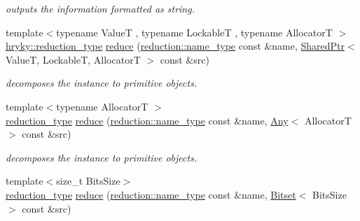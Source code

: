 \begin{DoxyCompactItemize}
\begin{DoxyCompactList}\small\item\em outputs the information formatted as string. \end{DoxyCompactList}\item 
\hypertarget{namespacehryky_abe460d6765cad7fbca8945ceb1d9d52e}{{\footnotesize template$<$typename Value\-T , typename Lockable\-T , typename Allocator\-T $>$ }\\\hyperlink{namespacehryky_a343a9a4c36a586be5c2693156200eadc}{hryky\-::reduction\-\_\-type} \hyperlink{namespacehryky_abe460d6765cad7fbca8945ceb1d9d52e}{reduce} (\hyperlink{namespacehryky_1_1reduction_ac686c30a4c8d196bbd0f05629a6b921f}{reduction\-::name\-\_\-type} const \&name, \hyperlink{classhryky_1_1_shared_ptr}{Shared\-Ptr}$<$ Value\-T, Lockable\-T, Allocator\-T $>$ const \&src)}\label{namespacehryky_abe460d6765cad7fbca8945ceb1d9d52e}

\begin{DoxyCompactList}\small\item\em decomposes the instance to primitive objects. \end{DoxyCompactList}\item 
\hypertarget{namespacehryky_a694d24276778b9967b22a08675292f5f}{{\footnotesize template$<$typename Allocator\-T $>$ }\\\hyperlink{namespacehryky_a343a9a4c36a586be5c2693156200eadc}{reduction\-\_\-type} \hyperlink{namespacehryky_a694d24276778b9967b22a08675292f5f}{reduce} (\hyperlink{namespacehryky_1_1reduction_ac686c30a4c8d196bbd0f05629a6b921f}{reduction\-::name\-\_\-type} const \&name, \hyperlink{classhryky_1_1_any}{Any}$<$ Allocator\-T $>$ const \&src)}\label{namespacehryky_a694d24276778b9967b22a08675292f5f}

\begin{DoxyCompactList}\small\item\em decomposes the instance to primitive objects. \end{DoxyCompactList}\item 
\hypertarget{namespacehryky_af7b750a06d6c5b780d3473e3fa1e7bf9}{{\footnotesize template$<$size\-\_\-t Bits\-Size$>$ }\\\hyperlink{namespacehryky_a343a9a4c36a586be5c2693156200eadc}{reduction\-\_\-type} \hyperlink{namespacehryky_af7b750a06d6c5b780d3473e3fa1e7bf9}{reduce} (\hyperlink{namespacehryky_1_1reduction_ac686c30a4c8d196bbd0f05629a6b921f}{reduction\-::name\-\_\-type} const \&name, \hyperlink{classhryky_1_1_bitset}{Bitset}$<$ Bits\-Size $>$ const \&src)}\label{namespacehryky_af7b750a06d6c5b780d3473e3fa1e7bf9}


\end{DoxyCompactItemize}

